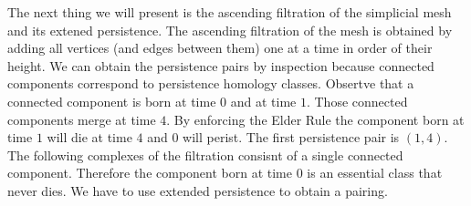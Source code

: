 The next thing we will present is the ascending filtration of the simplicial mesh and its extened persistence. The ascending filtration of the mesh is obtained by adding all vertices (and edges between them) one at a time in order of their height. We can obtain the persistence pairs by inspection because connected components correspond to persistence homology classes. Obsertve that a connected component is born at time $0$ and at time $1$. Those connected components merge at time $4$. By enforcing the Elder Rule the component born at time $1$ will die at time $4$ and $0$ will perist. The first persistence pair is $(1, 4)$. The following complexes of the filtration consisnt of a single connected component. Therefore the component born at time $0$ is an essential class that never dies. We have to use extended persistence to obtain a pairing.

